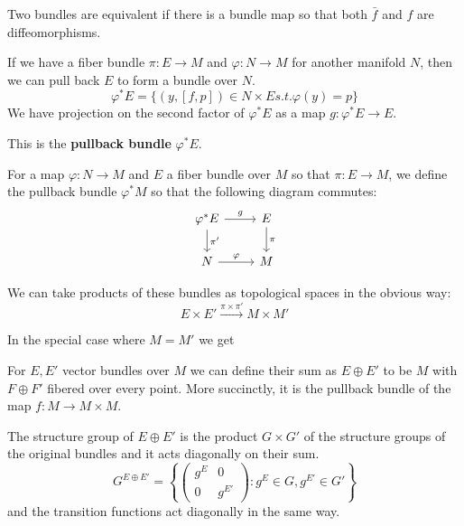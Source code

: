 		Two bundles are equivalent if there is a bundle map so that both $\bar f$ and $f$ are diffeomorphisms. 
				
		If we have a fiber bundle $\pi: E \rightarrow M$ and $\varphi: N \rightarrow M$ for another manifold $N$, then we can pull back $E$ to form a bundle over $N$. 
		\begin{equation}
			\varphi^* E = \{(y,[f,p]) \in N \times E s.t. \varphi(y) = p \}
		\end{equation}
		We have projection on the second factor of $\varphi^* E$ as a map $g: \varphi^* E \rightarrow E$. 
		
		This is the \textbf{pullback bundle} $\varphi^* E$.
		\begin{defn}
			For a map $\varphi: N \rightarrow M$ and $E$ a fiber bundle over $M$ so that $\pi: E \rightarrow M$, we define the pullback bundle $\varphi^* M$ so that the following diagram commutes:
			\[
			\begin{tikzcd}
			\varphi^* E \arrow{r}{g} \arrow{d}{\pi'} & E \arrow{d}{\pi} \\
			N \arrow{r}{\varphi} & M
			\end{tikzcd}
			\]
		\end{defn}
		
		We can take products of these bundles as topological spaces in the obvious way: 
		\begin{equation}
			E \times E' \xrightarrow{\pi \times \pi'} M \times M'
		\end{equation}
		
		In the special case where $M = M'$ we get 
		\begin{defn}
			For $E, E'$ vector bundles over $M$ we can define their sum as $E \oplus E'$ to be $M$ with $F \oplus F'$ fibered over every point. 
			More succinctly, it is the pullback bundle of the map $f: M \rightarrow M \times M$.
			
			The structure group of $E \oplus E'$ is the product $G \times G'$ of the structure groups of the original bundles and it acts diagonally on their sum.
			\begin{equation}
				G^{E \oplus E'} = \left \{ \begin{pmatrix}
					g^E & 0 \\
					0 & g^{E'}
				\end{pmatrix} : g^E \in G, g^{E'} \in G' \right \}
			\end{equation}
			and the transition functions act diagonally in the same way. 
		\end{defn}
		
